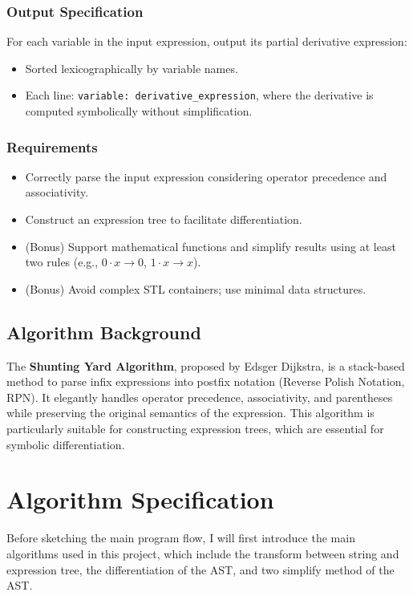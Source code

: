 \documentclass{report}
\begin{document}
\subsection*{Output Specification}
For each variable in the input expression, output its partial derivative expression:
\begin{itemize}
    \item Sorted lexicographically by variable names.
    \item Each line: \texttt{variable: derivative\_expression}, where the derivative is computed symbolically without simplification.
\end{itemize}

\subsection*{Requirements}
\begin{itemize}
    \item Correctly parse the input expression considering operator precedence and associativity.
    \item Construct an expression tree to facilitate differentiation.
    \item (Bonus) Support mathematical functions and simplify results using at least two rules (e.g., $0 \cdot x \rightarrow 0$, $1 \cdot x \rightarrow x$).
    \item (Bonus) Avoid complex STL containers; use minimal data structures.
\end{itemize}

\section*{Algorithm Background}
The \textbf{Shunting Yard Algorithm}, proposed by Edsger Dijkstra, is a stack-based method to parse infix expressions into postfix notation (Reverse Polish Notation, RPN). It elegantly handles operator precedence, associativity, and parentheses while preserving the original semantics of the expression. This algorithm is particularly suitable for constructing expression trees, which are essential for symbolic differentiation.


\newpage
\chapter{Algorithm Specification}

Before sketching the main program flow, I will first introduce the main algorithms used in this project, which include the transform between string and expression tree, the differentiation of the AST, and two simplify method of the AST.
\end{document}
